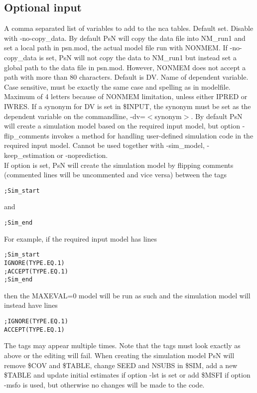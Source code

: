 \subsection{Optional input}
\begin{optionlist}
A comma separated list of variables to add to the nca tables.
\nextopt
{}
Default set. Disable with -no-copy\_data. By default PsN will copy the data file into NM\_run1 and set a local path in psn.mod, the actual model file run with NONMEM. If -no-copy\_data is set, PsN will not copy the data to NM\_run1 but instead set a global path to the data file in psn.mod. However, NONMEM does not accept a path with more than 80 characters.
\nextopt
{}
Default is DV. Name of dependent variable. Case sensitive, must be exactly the same case and spelling as in modelfile. Maximum of 4 letters because of NONMEM limitation, unless either IPRED or IWRES. If a synonym for DV is set in \$INPUT, the synonym must be set as the dependent variable on the commandline, -dv=$<$synonym$>$. 
\nextopt	
{}
By default PsN will create a simulation model based on the required input model, but option -flip\_comments invokes a method for handling user-defined simulation code in the required input model. Cannot be used together with -sim\_model, -keep\_estimation or -noprediction. \\
If option is set, PsN will create the simulation model by flipping comments (commented lines will be uncommented and vice versa) between the tags
\begin{verbatim}
;Sim_start
\end{verbatim}
and 
\begin{verbatim}
;Sim_end
\end{verbatim}
\newpage
For example, if the required input model has lines
\begin{verbatim}
;Sim_start 
IGNORE(TYPE.EQ.1)
;ACCEPT(TYPE.EQ.1) 
;Sim_end
\end{verbatim}
then the MAXEVAL=0 model will be run as such and the simulation model will instead have lines
\begin{verbatim}
;IGNORE(TYPE.EQ.1)
ACCEPT(TYPE.EQ.1) 
\end{verbatim}
The tags may appear multiple times. Note that the tags must look exactly  as above or the editing will fail. When creating the simulation model PsN will remove \$COV and \$TABLE, change SEED and NSUBS in \$SIM, add a new \$TABLE and  update initial estimates if option -lst is set or add \$MSFI if option -msfo is used, but otherwise no changes will be made to the code. 

\end{optionlist}
